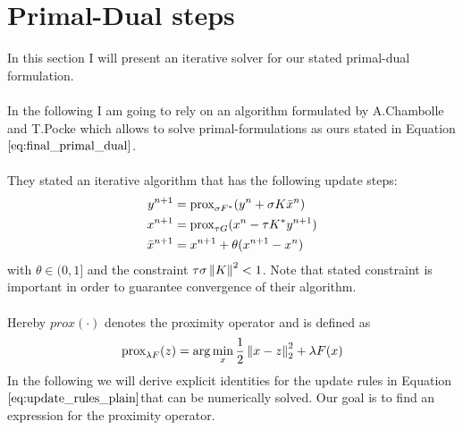 \section{Primal-Dual steps}
In this section I will present an iterative solver for our stated primal-dual formulation. \\ \\
In the following I am going to rely on an algorithm formulated by A.Chambolle and T.Pocke which allows to solve primal-formulations as ours stated in Equation $\ref{eq:final_primal_dual}$. \\ \\
They stated an iterative algorithm that has the following update steps:
\begin{align}
	y^{n+1} &= \text{prox}_{\sigma F^*}(y^n + \sigma K \bar{x}^n) \nonumber \\
	x^{n+1} &= \text{prox}_{\tau G}(x^n - \tau K^* y^{n+1}) \\
	\bar{x}^{n+1} &= x^{n+1} + \theta(x^{n+1} - x^n)
\label{eq:update_rules_plain}	
\end{align}
with $\theta \in (0, 1]$ and the constraint $\tau \sigma \left\lVert K\right\rVert^2 < 1$. Note that stated constraint is important in order to guarantee convergence of their algorithm. \\ \\
Hereby $prox(\cdot)$ denotes the proximity operator and is defined as 
\begin{equation}
	\text{prox}_{\lambda F}(z) = \arg \min_x \frac{1}{2} \left\lVert x - z\right\rVert_2^2 + \lambda F(x)
\end{equation}
In the following we will derive explicit identities for the update rules in Equation $\ref{eq:update_rules_plain}$that can be numerically solved. Our goal is to find an expression for the proximity operator.


